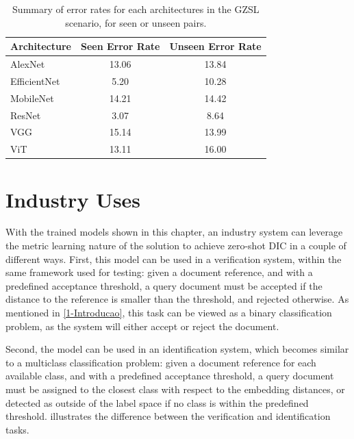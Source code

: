 \begin{table}[t!]
    \centering
    \caption{Summary of error rates for each architectures in the \gls{GZSL} scenario, for seen or unseen pairs.}
    \label{tab:gzsl_summary}
    \begin{tabular}{lcc}
        \toprule
        \textbf{Architecture} & \textbf{Seen Error Rate} & \textbf{Unseen Error Rate} \\
        \midrule
        AlexNet & 13.06 & 13.84 \\
        EfficientNet & 5.20 & 10.28 \\
        MobileNet & 14.21 & 14.42 \\
        ResNet & 3.07 & 8.64 \\
        VGG & 15.14 & 13.99 \\
        ViT & 13.11 & 16.00 \\
        \bottomrule
    \end{tabular}
\end{table}

\section{Industry Uses}

With the trained models shown in this chapter, an industry system can leverage the metric learning nature of the solution to achieve zero-shot \gls{DIC} in a couple of different ways. First, this model can be used in a verification system, within the same framework used for testing: given a document reference, and with a predefined acceptance threshold, a query document must be accepted if the distance to the reference is smaller than the threshold, and rejected otherwise. As mentioned in \ref{1-Introducao}, this task can be viewed as a binary classification problem, as the system will either accept or reject the document.

Second, the model can be used in an identification system, which becomes similar to a multiclass classification problem: given a document reference for each available class, and with a predefined acceptance threshold, a query document must be assigned to the closest class with respect to the embedding distances, or detected as outside of the label space if no class is within the predefined threshold.  illustrates the difference between the verification and identification tasks.

